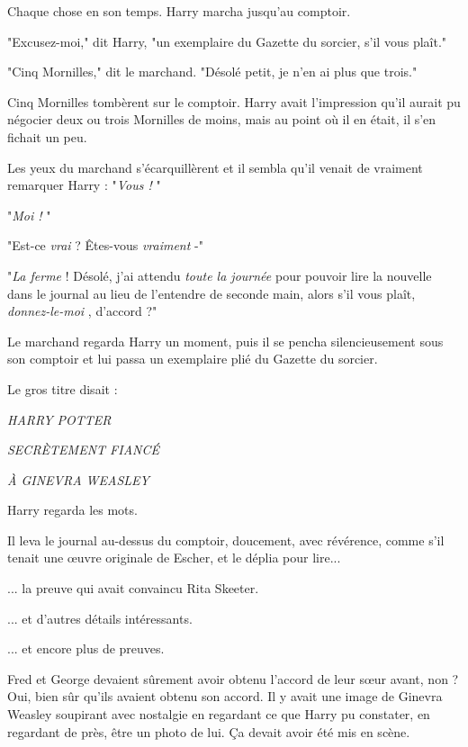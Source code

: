 Chaque chose en son temps. Harry marcha jusqu'au comptoir.

"Excusez-moi," dit Harry, "un exemplaire du Gazette du sorcier, s'il vous plaît."

"Cinq Mornilles," dit le marchand. "Désolé petit, je n'en ai plus que trois."

Cinq Mornilles tombèrent sur le comptoir. Harry avait l'impression qu'il aurait pu négocier deux ou trois Mornilles de moins, mais au point où il en était, il s'en fichait un peu.

Les yeux du marchand s'écarquillèrent et il sembla qu'il venait de vraiment remarquer Harry : "\emph{Vous !} "

"\emph{Moi !} "

"Est-ce \emph{vrai}  ? Êtes-vous \emph{vraiment}  -"

"\emph{La ferme}  ! Désolé, j'ai attendu \emph{toute la journée}  pour pouvoir lire la nouvelle dans le journal au lieu de l'entendre de seconde main, alors s'il vous plaît, \emph{donnez-le-moi} , d'accord ?"

Le marchand regarda Harry un moment, puis il se pencha silencieusement sous son comptoir et lui passa un exemplaire plié du Gazette du sorcier.

Le gros titre disait :


\begin{center}\emph{HARRY POTTER} \end{center}



\begin{center}\emph{SECRÈTEMENT FIANCÉ} \end{center}



\begin{center}\emph{À GINEVRA WEASLEY} \end{center}


Harry regarda les mots.

Il leva le journal au-dessus du comptoir, doucement, avec révérence, comme s'il tenait une œuvre originale de Escher, et le déplia pour lire...

... la preuve qui avait convaincu Rita Skeeter.

... et d'autres détails intéressants.

... et encore plus de preuves.

Fred et George devaient sûrement avoir obtenu l'accord de leur sœur avant, non ? Oui, bien sûr qu'ils avaient obtenu son accord. Il y avait une image de Ginevra Weasley soupirant avec nostalgie en regardant ce que Harry pu constater, en regardant de près, être un photo de lui. Ça devait avoir été mis en scène.

